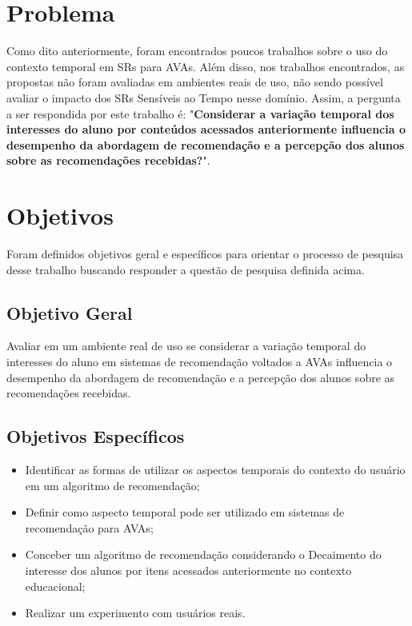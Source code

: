 \section{Problema}

Como dito anteriormente, foram encontrados poucos trabalhos sobre o uso do contexto temporal em SRs para AVAs. Além disso,
nos trabalhos encontrados, as propostas não foram avaliadas em ambientes reais de uso, não sendo possível avaliar o
impacto dos SRs Sensíveis ao Tempo nesse domínio. Assim, a pergunta a ser respondida por este trabalho
é: "\textbf{Considerar a variação temporal dos interesses do aluno por conteúdos acessados anteriormente influencia o desempenho
da abordagem de recomendação e a percepção dos alunos sobre as recomendações recebidas?}".

\section{Objetivos}

Foram definidos objetivos geral e específicos para orientar o processo de pesquisa desse trabalho buscando responder a questão
de pesquisa definida acima.

\subsection{Objetivo Geral}

Avaliar em um ambiente real de uso se considerar a variação temporal do interesses do aluno em sistemas de recomendação
voltados a AVAs influencia o desempenho da abordagem de recomendação e a percepção dos alunos sobre as recomendações recebidas.

\subsection{Objetivos Específicos}

\begin{itemize}
\item Identificar as formas de utilizar os aspectos temporais do contexto do usuário em um algoritmo de recomendação;
\item Definir como aspecto temporal pode ser utilizado em sistemas de recomendação para AVAs;
\item Conceber um algoritmo de recomendação considerando o Decaimento do interesse dos alunos por itens acessados
anteriormente no contexto educacional;
\item Realizar um experimento com usuários reais.
\end{itemize}

